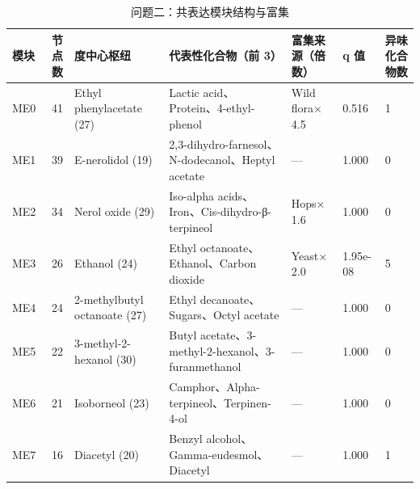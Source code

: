 \begin{table}[tbp]
\centering
\caption{问题二：共表达模块结构与富集}
\label{tab:t06_q2_modules}
\footnotesize
\setlength{\tabcolsep}{3.5pt}
\begin{tabular}{lrlllll}
\toprule
模块 & 节点数 & 度中心枢纽 & 代表性化合物（前 3） & 富集来源（倍数） & q 值 & 异味化合物数 \\
\midrule
ME0 & 41 & Ethyl phenylacetate (27) & Lactic acid、Protein、4-ethyl-phenol & Wild flora$\times$4.5 & 0.516 & 1 \\
ME1 & 39 & E-nerolidol (19) & 2,3-dihydro-farnesol、N-dodecanol、Heptyl acetate & — & 1.000 & 0 \\
ME2 & 34 & Nerol oxide (29) & Iso-alpha acids、Iron、Cis-dihydro-β-terpineol & Hops$\times$1.6 & 1.000 & 0 \\
ME3 & 26 & Ethanol (24) & Ethyl octanoate、Ethanol、Carbon dioxide & Yeast$\times$2.0 & 1.95e-08 & 5 \\
ME4 & 24 & 2-methylbutyl octanoate (27) & Ethyl decanoate、Sugars、Octyl acetate & — & 1.000 & 0 \\
ME5 & 22 & 3-methyl-2-hexanol (30) & Butyl acetate、3-methyl-2-hexanol、3-furanmethanol & — & 1.000 & 0 \\
ME6 & 21 & Isoborneol (23) & Camphor、Alpha-terpineol、Terpinen-4-ol & — & 1.000 & 0 \\
ME7 & 16 & Diacetyl (20) & Benzyl alcohol、Gamma-eudesmol、Diacetyl & — & 1.000 & 1 \\
\bottomrule
\end{tabular}
\end{table}
